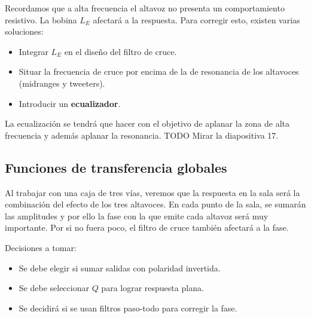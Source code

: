 \documentclass[12pt, a4paper]{article}
\begin{document}
Recordamos que a alta frecuencia el altavoz no presenta un comportamiento resistivo. La bobina $L_E$ afectará a la respuesta. Para corregir esto, existen varias soluciones:
\begin{itemize}
  \item Integrar $L_E$ en el diseño del filtro de cruce.
  \item Situar la frecuencia de cruce por encima de la de resonancia de los altavoces (midranges y tweeters).
  \item Introducir un \textbf{ecualizador}.
\end{itemize}

La ecualización se tendrá que hacer con el objetivo de aplanar la zona de alta frecuencia y además aplanar la resonancia. TODO Mirar la diapositiva 17.

\subsection{Funciones de transferencia globales}

Al trabajar con una caja de tres vías, veremos que la respuesta en la sala será la combinación del efecto de los tres altavoces. En cada punto de la sala, se sumarán las amplitudes y por ello la fase con la que emite cada altavoz será muy importante. Por si no fuera poco, el filtro de cruce también afectará a la fase.

Decisiones a tomar:
\begin{itemize}
  \item Se debe elegir si sumar salidas con polaridad invertida.
  \item Se debe seleccionar $Q$ para lograr respuesta plana.
  \item Se decidirá si se usan filtros paso-todo para corregir la fase.
\end{itemize}
\end{document}
